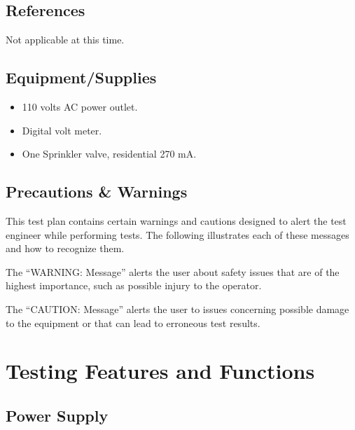 \documentclass{article}
\begin{document}
\subsection{References}

Not applicable at this time.


\subsection{Equipment/Supplies}

\begin{itemize}
\item 110 volts AC power outlet.
\item Digital volt meter.
\item One Sprinkler valve, residential 270 mA.
\end{itemize}

\subsection{Precautions \& Warnings}

This test plan contains certain warnings and cautions designed to alert the
test engineer while performing tests. The following illustrates each of
these messages and how to recognize them.


The ``WARNING: Message'' alerts the user about safety issues that are of
the highest importance, such as possible injury to the operator.


The ``CAUTION: Message'' alerts the user to issues concerning possible
damage to the equipment or that can lead to erroneous test results.


\section{Testing Features and Functions}

\subsection{Power Supply}
\end{document}
